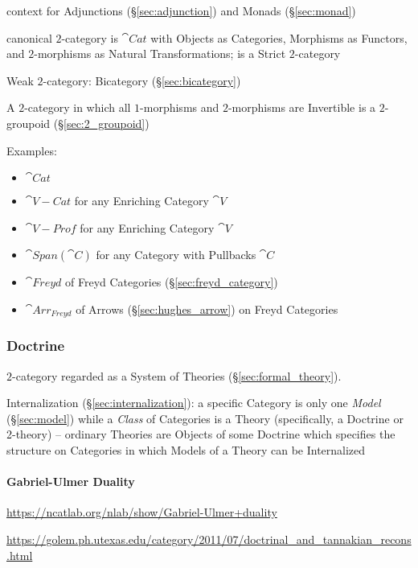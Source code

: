 context for Adjunctions (\S\ref{sec:adjunction}) and Monads
(\S\ref{sec:monad})

canonical $2$-category is $\cat{Cat}$ with Objects as Categories,
Morphisms as Functors, and $2$-morphisms as Natural Transformations;
is a Strict $2$-category

Weak $2$-category: Bicategory (\S\ref{sec:bicategory})

A $2$-category in which all $1$-morphisms and $2$-morphisms are
Invertible is a $2$-groupoid (\S\ref{sec:2_groupoid})

Examples:
\begin{itemize}
\item $\cat{Cat}$
\item $\cat{V-Cat}$ for any Enriching Category $\cat{V}$
\item $\cat{V-Prof}$ for any Enriching Category $\cat{V}$
\item $\cat{Span}(\cat{C})$ for any Category with Pullbacks $\cat{C}$
\item $\cat{Freyd}$ of Freyd Categories (\S\ref{sec:freyd_category})
\item $\cat{Arr_{Freyd}}$ of Arrows (\S\ref{sec:hughes_arrow}) on
  Freyd Categories
\end{itemize}



\subsubsection{Doctrine}\label{sec:doctrine}

$2$-category regarded as a System of Theories
(\S\ref{sec:formal_theory}).

Internalization (\S\ref{sec:internalization}): a specific Category is
only one \emph{Model} (\S\ref{sec:model}) while a \emph{Class} of
Categories is a Theory (specifically, a Doctrine or 2-theory) --
ordinary Theories are Objects of some Doctrine which specifies the
structure on Categories in which Models of a Theory can be Internalized



\paragraph{Gabriel-Ulmer Duality}\label{sec:gabriel_ulmer_duality}
\hfill

\url{https://ncatlab.org/nlab/show/Gabriel-Ulmer+duality}

\url{https://golem.ph.utexas.edu/category/2011/07/doctrinal_and_tannakian_recons.html}

